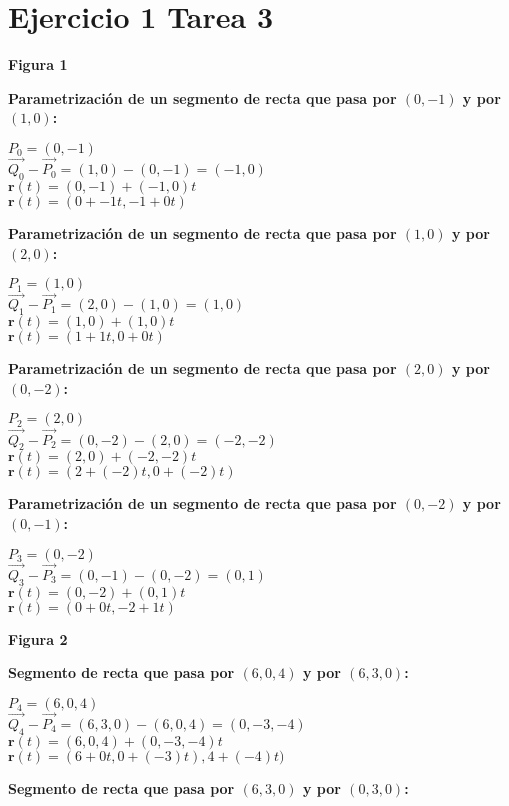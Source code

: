 \documentclass{article}
\begin{document}
\section*{Ejercicio 1 Tarea 3}

\textbf{Figura 1}

\textbf{Parametrización de un segmento de recta que pasa por $(0,-1)$ y por $(1,0)$:}

$P_0 = (0, -1)$ \\
$\vec{Q_0} - \vec{P_0} = (1, 0) - (0, -1) = (-1, 0)$ \\
$\mathbf{r}(t) = (0, -1) + (-1, 0)t$ \\
$\mathbf{r}(t) = (0 + -1t, -1 + 0t)$

\textbf{Parametrización de un segmento de recta que pasa por $(1,0)$ y por $(2,0)$:}

$P_1 = (1, 0)$ \\
$\vec{Q_1} - \vec{P_1} = (2, 0) - (1, 0) = (1, 0)$ \\
$\mathbf{r}(t) = (1, 0) + (1, 0)t$ \\
$\mathbf{r}(t) = (1 + 1t, 0 + 0t)$

\textbf{Parametrización de un segmento de recta que pasa por $(2,0)$ y por $(0,-2)$:}

$P_2 = (2, 0)$ \\
$\vec{Q_2} - \vec{P_2} = (0, -2) - (2, 0) = (-2, -2)$ \\
$\mathbf{r}(t) = (2, 0) + (-2, -2)t$ \\
$\mathbf{r}(t) = (2 + (-2)t, 0 + (-2)t)$

\textbf{Parametrización de un segmento de recta que pasa por $(0,-2)$ y por $(0,-1)$:}

$P_3 = (0, -2)$ \\
$\vec{Q_3} - \vec{P_3} = (0, -1) - (0, -2) = (0, 1)$ \\
$\mathbf{r}(t) = (0, -2) + (0, 1)t$ \\
$\mathbf{r}(t) = (0 + 0t, -2 + 1t)$

\textbf{Figura 2}

\textbf{Segmento de recta que pasa por $(6,0,4)$ y por $(6,3,0)$:}

$P_4 = (6,0,4)$ \\
$\vec{Q_4} - \vec{P_4} = (6,3,0) - (6,0,4) = (0, -3, -4)$ \\
$\mathbf{r}(t) = (6,0,4) + (0, -3, -4)t$ \\
$\mathbf{r}(t) = (6 + 0t, 0 + (-3)t), 4 + (-4)t)$

\textbf{Segmento de recta que pasa por $(6,3,0)$ y por $(0,3,0)$:}
\end{document}
